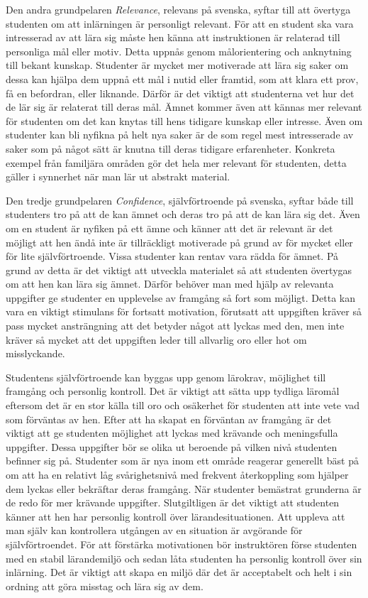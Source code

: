 \documentclass[]{article}
\begin{document}
Den andra grundpelaren \textit{Relevance}, relevans på svenska,
syftar till att övertyga studenten om att inlärningen är personligt relevant.
För att en student ska vara intresserad av att lära sig måste hen känna
att instruktionen är relaterad till personliga mål eller motiv.
Detta uppnås genom målorientering och anknytning till bekant kunskap.
Studenter är mycket mer motiverade att lära sig saker om dessa kan hjälpa dem
uppnå ett mål i nutid eller framtid, som att klara ett prov, få en befordran,
eller liknande. Därför är det viktigt att studenterna vet hur det de lär sig är
relaterat till deras mål. Ämnet kommer även att kännas mer relevant för studenten
om det kan knytas till hens tidigare kunskap eller intresse. Även om studenter kan
bli nyfikna på helt nya saker är de som regel mest intresserade av saker som på
något sätt är knutna till deras tidigare erfarenheter.
Konkreta exempel från familjära områden gör det hela mer relevant för studenten,
detta gäller i synnerhet när man lär ut abstrakt material.

Den tredje grundpelaren \textit{Confidence}, självförtroende på svenska,
syftar både till studenters tro på att de kan ämnet och deras tro på att
de kan lära sig det. Även om en student är nyfiken på ett ämne och känner
att det är relevant är det möjligt att hen ändå inte är tillräckligt
motiverade på grund av för mycket eller för lite självförtroende.
Vissa studenter kan rentav vara rädda för ämnet. På grund av detta är det
viktigt att utveckla materialet så att studenten övertygas om att hen kan
lära sig ämnet. Därför behöver man med hjälp av relevanta uppgifter ge studenter
en upplevelse av framgång så fort som möjligt. Detta kan vara en viktigt
stimulans för fortsatt motivation, förutsatt att uppgiften kräver så pass
mycket ansträngning att det betyder något att lyckas med den, men inte kräver
så mycket att det uppgiften leder till allvarlig oro eller hot om misslyckande.

Studentens självförtroende kan byggas upp genom lärokrav,
möjlighet till framgång och personlig kontroll.
Det är viktigt att sätta upp tydliga läromål eftersom det är en stor
källa till oro och osäkerhet för studenten att inte vete vad som
förväntas av hen. Efter att ha skapat en förväntan av framgång är det
viktigt att ge studenten möjlighet att lyckas med krävande och
meningsfulla uppgifter. Dessa uppgifter bör se olika ut beroende på
vilken nivå studenten befinner sig på. Studenter som är nya inom ett område
reagerar generellt bäst på om att ha en relativt låg svårighetsnivå med frekvent
återkoppling som hjälper dem lyckas eller bekräftar deras framgång.
När studenter bemästrat grunderna är de redo för mer krävande uppgifter.
Slutgiltligen är det viktigt att studenten känner att hen har personlig
kontroll över lärandesituationen. Att uppleva att  man själv kan
kontrollera utgången av en situation är avgörande för självförtroendet.
För att förstärka motivationen bör instruktören förse studenten med en
stabil lärandemiljö och sedan låta studenten ha personlig kontroll över sin
inlärning. Det är viktigt att skapa en miljö där det är acceptabelt och helt
i sin ordning att göra misstag och lära sig av dem.
\end{document}
